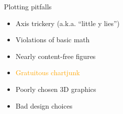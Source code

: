 \documentclass[
  ignorenonframetext,
]{beamer}
\providecommand{\tightlist}{%
  \setlength{\itemsep}{0pt}\setlength{\parskip}{0pt}}
\begin{document}
\begin{frame}{}
\label{section-16}
\end{frame}

\begin{frame}{}
\label{section-17}
\end{frame}

\begin{frame}{Plotting pitfalls}
\label{plotting-pitfalls-3}
\begin{itemize}
\tightlist
\item
  Axis trickery (a.k.a. ``little y lies'')
\item
  Violations of basic math
\item
  Nearly content-free figures
\item
  \textcolor{orange}{Gratuitous chartjunk}
\item
  Poorly chosen 3D graphics
\item
  Bad design choices
\end{itemize}
\end{frame}
\end{document}
